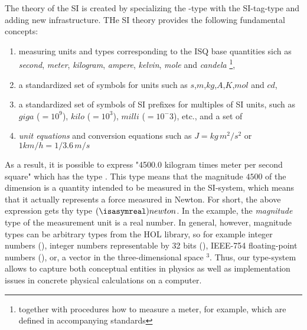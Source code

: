 \documentclass[11pt,a4paper]{book}
\begin{document}
The theory of the SI is created by specializing the -type with the 
SI-tag-type and adding new infrastructure. THe SI theory provides the following fundamental 
concepts:
\begin{enumerate}%
\item measuring units and types corresponding to the ISQ base quantities sich
      as \emph{second}, \emph{meter}, \emph{kilogram}, \emph{ampere}, \emph{kelvin}, \emph{mole} and
      \emph{candela} \footnote{together with procedures how to measure a meter, for example, which are
      defined in accompanying standards},
\item a standardized set of symbols for units such as $s$,$m$,$kg$,$A$,$K$,$mol$ and $cd$,
\item a standardized set of symbols of SI prefixes for multiples of SI units, such as 
      $giga$ ($=10^9$), $kilo$ ($=10^3$), $milli$ ($=10^-3$), etc., and a set of
\item \emph{unit equations} and conversion equations such as $J = kg\,m^2/s^2$ or $1 km/h = 1/3.6\,m/s$
\end{enumerate}

As a result, it is possible to express "4500.0 kilogram times meter per second square" which has 
the type 
. 
This type means that the magnitude $4500$ of the dimension 
 is a quantity intended to be measured in the SI-system, which means that it actually
represents a force measured in Newton. For short, the above expression gets thy type $(\isasymreal)newton$.
In the example, the \emph{magnitude} type of the measurement unit is a real number. 
In general, however, magnitude types can be arbitrary types from the HOL library, so 
for example integer numbers (), integer numbers representable by 32 bits (), 
IEEE-754 floating-point numbers (), or, 
a vector in the three-dimensional space  \isa{\isasymreal}$^3$. Thus, our type-system allows
to capture both conceptual entities in physics as well as 
implementation issues in concrete physical calculations on a computer.
\end{document}
